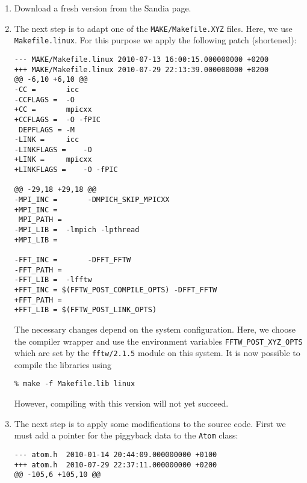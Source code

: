 \begin{enumerate}
\item Download a fresh \LAMMPS version from the Sandia page.

\item The next step is to adapt one of the \lstinline[style=SHELL]|MAKE/Makefile.XYZ| files. Here, we use \lstinline[style= SHELL]|Makefile.linux|. For this purpose we apply the following patch (shortened):

\vspace{1pt}
\begin{lstlisting}[style=SHELL_SMALL,frame=lines]
--- MAKE/Makefile.linux	2010-07-13 16:00:15.000000000 +0200
+++ MAKE/Makefile.linux	2010-07-29 22:13:39.000000000 +0200
@@ -6,10 +6,10 @@
-CC =		icc
-CCFLAGS =	-O
+CC =		mpicxx
+CCFLAGS =	-O -fPIC
 DEPFLAGS =	-M
-LINK =		icc
-LINKFLAGS =	-O
+LINK =		mpicxx
+LINKFLAGS =	-O -fPIC

@@ -29,18 +29,18 @@
-MPI_INC =       -DMPICH_SKIP_MPICXX 
+MPI_INC = 
 MPI_PATH = 
-MPI_LIB =	-lmpich -lpthread
+MPI_LIB =
 
-FFT_INC =       -DFFT_FFTW
-FFT_PATH = 
-FFT_LIB =	-lfftw
+FFT_INC = $(FFTW_POST_COMPILE_OPTS) -DFFT_FFTW
+FFT_PATH =
+FFT_LIB = $(FFTW_POST_LINK_OPTS)
\end{lstlisting}

The necessary changes depend on the system configuration. Here, we choose the \MPI compiler wrapper and use the environment variables \lstinline[style=SHELL]|FFTW_POST_XYZ_OPTS| which are set by the \lstinline[style=SHELL]|fftw/2.1.5| module on this system. It is now possible to compile the \LAMMPS libraries using

\begin{lstlisting}[style=SHELL]
% make makelib
% make -f Makefile.lib linux
\end{lstlisting}

However, compiling \MACI with this \LAMMPS version will not yet succeed.

\item The next step is to apply some modifications to the \LAMMPS source code. First we must add a pointer for the piggyback data to the \lstinline[style=CODE]|Atom| class:

\vspace{1pt}
\begin{lstlisting}[style=CODE_SMALL,frame=lines]
--- atom.h	2010-01-14 20:44:09.000000000 +0100
+++ atom.h	2010-07-29 22:37:11.000000000 +0200
@@ -105,6 +105,10 @@
 

\end{lstlisting}
\end{enumerate}
